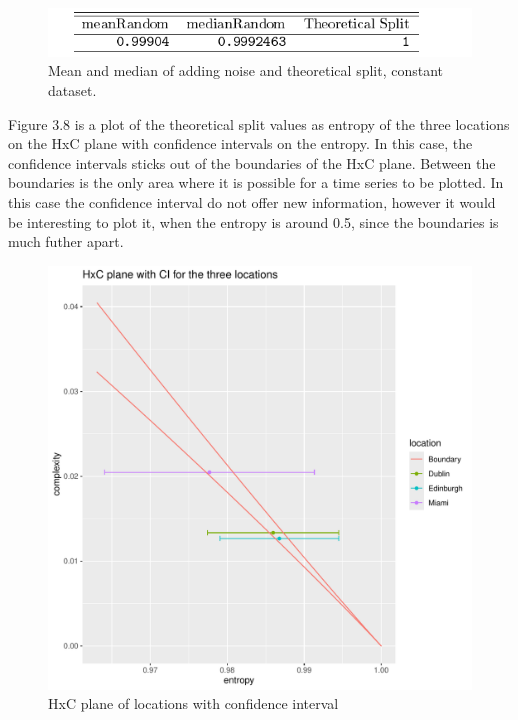 \begin{figure}
    \centering
    \includegraphics[width=\textwidth,keepaspectratio]{Weather/random_vs_theoreticalSplitWhiteNoise.pdf}
    \caption{Mean and median of adding noise and theoretical split, constant dataset.}
\end{figure}

Figure 3.8 is a plot of the theoretical split values as entropy of the three locations on the HxC plane with confidence intervals on the entropy. In this case, the confidence intervals sticks out of the boundaries of the HxC plane. Between the boundaries is the only area where it is possible for a time series to be plotted. In this case the confidence interval do not offer new information, however it would be interesting to plot it, when the entropy is around 0.5, since the boundaries is much futher apart.

\begin{figure}
    \centering
    \includegraphics[width=\textwidth,keepaspectratio]{Weather/confidenceIntervalPlot.pdf}
    \caption{HxC plane of locations with confidence interval}
\end{figure}

